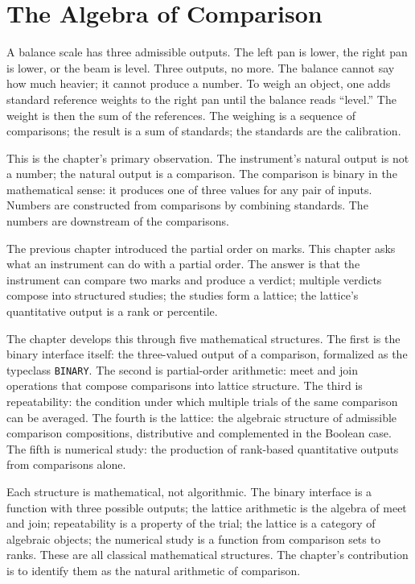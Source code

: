 \chapter{The Algebra of Comparison}
\label{chap:algebra-of-comparison}


\begin{chapteressay}

A balance scale has three admissible outputs. The left pan is lower, the
right pan is lower, or the beam is level. Three outputs, no more. The
balance cannot say how much heavier; it cannot produce a number. To
weigh an object, one adds standard reference weights to the right pan
until the balance reads ``level.'' The weight is then the sum of the
references. The weighing is a sequence of comparisons; the result is a
sum of standards; the standards are the calibration.

This is the chapter's primary observation. The instrument's natural
output is not a number; the natural output is a comparison. The
comparison is binary in the mathematical sense: it produces one of
three values for any pair of inputs. Numbers are constructed from
comparisons by combining standards. The numbers are downstream of the
comparisons.

The previous chapter introduced the partial order on marks. This chapter
asks what an instrument can do with a partial order. The answer is that
the instrument can compare two marks and produce a verdict; multiple
verdicts compose into structured studies; the studies form a lattice;
the lattice's quantitative output is a rank or percentile.

The chapter develops this through five mathematical structures. The
first is the binary interface itself: the three-valued output of a
comparison, formalized as the typeclass \texttt{BINARY}. The second is
partial-order arithmetic: meet and join operations that compose
comparisons into lattice structure. The third is repeatability: the
condition under which multiple trials of the same comparison can be
averaged. The fourth is the lattice: the algebraic structure of
admissible comparison compositions, distributive and complemented in
the Boolean case. The fifth is numerical study: the production of
rank-based quantitative outputs from comparisons alone.

Each structure is mathematical, not algorithmic. The binary interface
is a function with three possible outputs; the lattice arithmetic is
the algebra of meet and join; repeatability is a property of the
trial; the lattice is a category of algebraic objects; the numerical
study is a function from comparison sets to ranks. These are all
classical mathematical structures. The chapter's contribution is to
identify them as the natural arithmetic of comparison.


\end{chapteressay}
